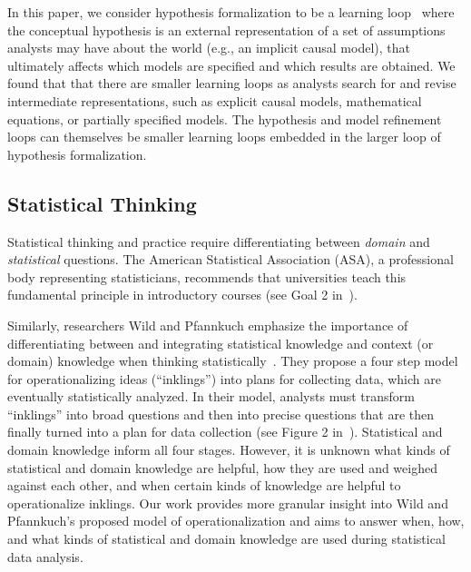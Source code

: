 In this paper, we consider hypothesis formalization to be a learning loop~\cite{russell1993cost} where
the conceptual hypothesis is an external representation of a set of assumptions
analysts may have about the world (e.g., an implicit causal model), that ultimately
affects which models are specified and which results are
obtained. We found that that there are smaller learning loops as analysts search
for and revise intermediate representations, such as explicit causal models,
mathematical equations, or partially specified models. The
hypothesis and model refinement loops can themselves be smaller learning loops
embedded in the larger loop of hypothesis formalization. 


\subsection{Statistical Thinking} 
Statistical thinking and practice require differentiating between
\textit{domain} and \textit{statistical} questions. The American Statistical
Association (ASA), a professional body representing statisticians, recommends
that universities teach this fundamental principle in introductory courses (see
Goal 2 in~\cite{carver2016guidelines}). 

Similarly, researchers Wild and Pfannkuch emphasize the importance of
differentiating between and integrating statistical knowledge and context (or
domain) knowledge when thinking
statistically~\cite{pfannkuch1997statistical,pfannkuch2000statistical,wild1999statisticalThinking}.
They propose a four step model for operationalizing ideas (``inklings'') into
plans for collecting data, which are eventually statistically analyzed. In their
model, analysts must transform ``inklings'' into broad questions and then into
precise questions that are then finally turned into a plan for data collection
(see Figure 2 in~\cite{wild1999statisticalThinking}). Statistical and domain
knowledge inform all four stages. However, it is unknown what kinds of statistical and domain
knowledge are helpful, how they are used and weighed against each other, and
when certain kinds of knowledge are helpful to operationalize inklings. Our work provides more granular insight into Wild and Pfannkuch's
proposed model of operationalization and aims to answer when, how, and what
kinds of statistical and domain knowledge are used during statistical data
analysis. 

